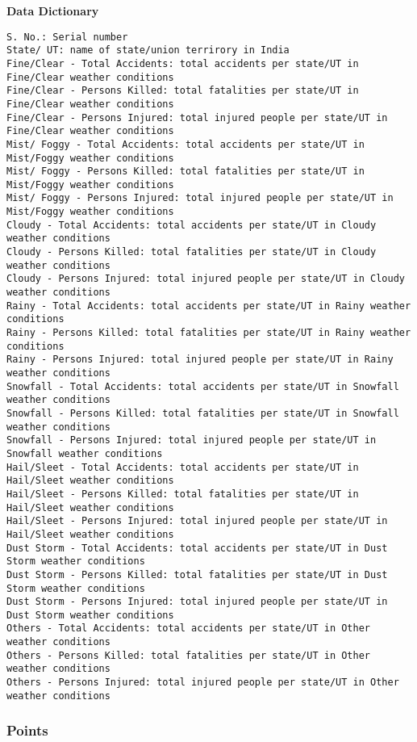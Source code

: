 \documentclass[
]{article}
\begin{document}
\textbf{Data Dictionary}

\begin{verbatim}
S. No.: Serial number
State/ UT: name of state/union terrirory in India
Fine/Clear - Total Accidents: total accidents per state/UT in Fine/Clear weather conditions
Fine/Clear - Persons Killed: total fatalities per state/UT in Fine/Clear weather conditions
Fine/Clear - Persons Injured: total injured people per state/UT in Fine/Clear weather conditions
Mist/ Foggy - Total Accidents: total accidents per state/UT in Mist/Foggy weather conditions
Mist/ Foggy - Persons Killed: total fatalities per state/UT in Mist/Foggy weather conditions
Mist/ Foggy - Persons Injured: total injured people per state/UT in Mist/Foggy weather conditions
Cloudy - Total Accidents: total accidents per state/UT in Cloudy weather conditions
Cloudy - Persons Killed: total fatalities per state/UT in Cloudy weather conditions
Cloudy - Persons Injured: total injured people per state/UT in Cloudy weather conditions
Rainy - Total Accidents: total accidents per state/UT in Rainy weather conditions
Rainy - Persons Killed: total fatalities per state/UT in Rainy weather conditions
Rainy - Persons Injured: total injured people per state/UT in Rainy weather conditions
Snowfall - Total Accidents: total accidents per state/UT in Snowfall weather conditions
Snowfall - Persons Killed: total fatalities per state/UT in Snowfall weather conditions
Snowfall - Persons Injured: total injured people per state/UT in Snowfall weather conditions
Hail/Sleet - Total Accidents: total accidents per state/UT in Hail/Sleet weather conditions
Hail/Sleet - Persons Killed: total fatalities per state/UT in Hail/Sleet weather conditions
Hail/Sleet - Persons Injured: total injured people per state/UT in Hail/Sleet weather conditions
Dust Storm - Total Accidents: total accidents per state/UT in Dust Storm weather conditions
Dust Storm - Persons Killed: total fatalities per state/UT in Dust Storm weather conditions
Dust Storm - Persons Injured: total injured people per state/UT in Dust Storm weather conditions
Others - Total Accidents: total accidents per state/UT in Other weather conditions
Others - Persons Killed: total fatalities per state/UT in Other weather conditions
Others - Persons Injured: total injured people per state/UT in Other weather conditions
\end{verbatim}

\hypertarget{points}{%
\subsubsection{Points}\label{points}}
\end{document}
